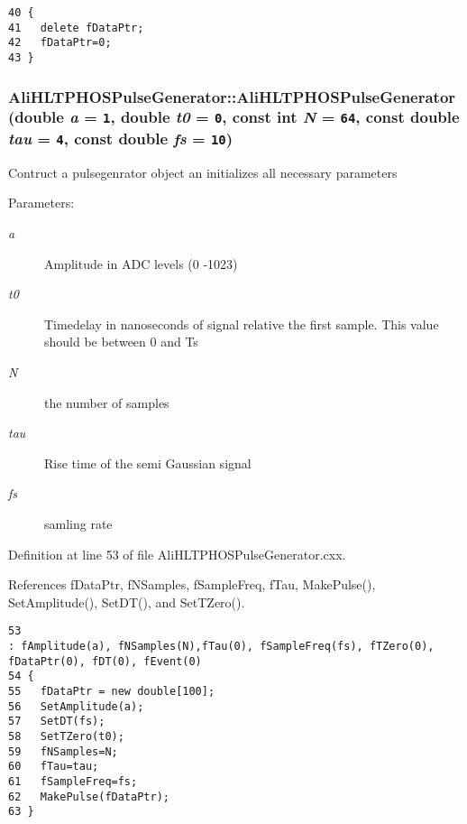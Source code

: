 \footnotesize\begin{verbatim}40 {
41   delete fDataPtr;
42   fDataPtr=0;
43 }
\end{verbatim}\normalsize 


\subsubsection{\setlength{\rightskip}{0pt plus 5cm}Ali\-HLTPHOSPulse\-Generator::Ali\-HLTPHOSPulse\-Generator (double {\em a} = {\tt 1}, double {\em t0} = {\tt 0}, const int {\em N} = {\tt 64}, const double {\em tau} = {\tt 4}, const double {\em fs} = {\tt 10})}\label{classAliHLTPHOSPulseGenerator_a2}


Contruct a pulsegenrator object an initializes all necessary parameters \begin{Desc}
\item[Parameters:]
\begin{description}
\item[{\em a}]Amplitude in ADC levels (0 -1023) \item[{\em t0}]Timedelay in nanoseconds of signal relative the first sample. This value should be between 0 and Ts \item[{\em N}]the number of samples \item[{\em tau}]Rise time of the semi Gaussian signal \item[{\em fs}]samling rate \end{description}
\end{Desc}


Definition at line 53 of file Ali\-HLTPHOSPulse\-Generator.cxx.

References f\-Data\-Ptr, f\-NSamples, f\-Sample\-Freq, f\-Tau, Make\-Pulse(), Set\-Amplitude(), Set\-DT(), and Set\-TZero().

\footnotesize\begin{verbatim}53                                                                                                    : fAmplitude(a), fNSamples(N),fTau(0), fSampleFreq(fs), fTZero(0), fDataPtr(0), fDT(0), fEvent(0)
54 {
55   fDataPtr = new double[100];
56   SetAmplitude(a);
57   SetDT(fs);
58   SetTZero(t0);
59   fNSamples=N;
60   fTau=tau;
61   fSampleFreq=fs;
62   MakePulse(fDataPtr);
63 }
\end{verbatim}\normalsize 


